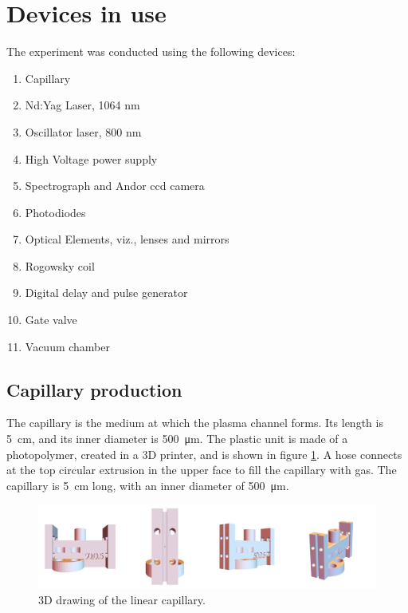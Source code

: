 \documentclass[justified,nofonts,nobib,openany]{tufte-book}
\begin{document}
	\section{Devices in use}\label{sec:devices}
The experiment was conducted using the following devices:
\begin{enumerate}
    \item Capillary
    \item Nd:Yag Laser, 1064 nm
    \item Oscillator laser, 800 nm
    \item High Voltage power supply
    \item Spectrograph and Andor ccd camera
    \item Photodiodes
    \item Optical Elements, viz., lenses and mirrors
    \item Rogowsky coil
    \item Digital delay and pulse generator
    \item Gate valve
    \item Vacuum chamber
\end{enumerate}
\subsection{Capillary production}
The capillary is the medium at which the plasma channel forms. Its length is \SI{5}{\cm}, and its inner diameter is \SI{500}{\um}. The plastic unit is made of a photopolymer, created in a 3D printer, and is shown in figure \ref{fig:capillaryCAD}. A hose connects at the top circular extrusion in the upper face to fill the capillary with gas. The capillary is \SI{5}{\cm} long, with an inner diameter of \SI{500}{\um}.
\begin{figure}
    \centering
    \includegraphics[width=\textwidth]{figures/capillary_cad.png}
    \caption{3D drawing of the linear capillary.}
    \label{fig:capillaryCAD}
\end{figure}
\end{document}
